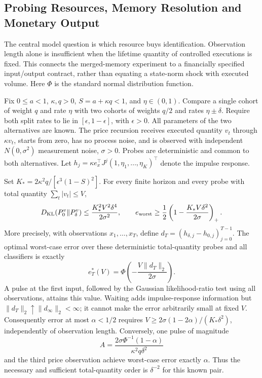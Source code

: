 \subsection{Probing Resources, Memory Resolution and Monetary Output}
\label{sec:resource_frontier}
The central model question is which resource buys identification. Observation length alone is insufficient when the lifetime quantity of controlled executions is fixed. This connects the merged-memory experiment to a financially specified input/output contract, rather than equating a state-norm shock with executed volume. Here $\Phi$ is the standard normal distribution function.

\begin{theorem}
\label{thm:resource_frontier}
Fix $0\le a<1$, $\kappa,q>0$, $S=a+\kappa q<1$, and $\eta\in(0,1)$. Compare a single cohort of weight $q$ and rate $\eta$ with two cohorts of weights $q/2$ and rates $\eta\pm\delta$. Require both split rates to lie in $[\epsilon,1-\epsilon]$, with $\epsilon>0$. All parameters of the two alternatives are known. The price recursion receives executed quantity $v_t$ through $\kappa v_t$, starts from zero, has no process noise, and is observed with independent $N(0,\sigma^2)$ measurement noise, $\sigma>0$. Probes are deterministic and common to both alternatives. Let $h_j=\kappa e_x^\top J^j(1,\eta_1,\ldots,\eta_K)^\top$ denote the impulse response.

Set $K_*=2\kappa^2q/[\epsilon^3(1-S)^2]$. For every finite horizon and every probe with total quantity $\sum_t|v_t|\le V$,
\begin{equation}
D_{\rm KL}(P_0^v\|P_\delta^v)
\le \frac{K_*^2 V^2\delta^4}{2\sigma^2},\qquad
e_{\rm worst}\ge\frac12\left(1-\frac{K_*V\delta^2}{2\sigma}\right)_+.
\label{eq:quantity_information}
\end{equation}
More precisely, with observations $x_1,\ldots,x_T$, define $d_T=(h_{\delta,j}-h_{0,j})_{j=0}^{T-1}$. The optimal worst-case error over these deterministic total-quantity probes and all classifiers is exactly
\begin{equation}
e^*_T(V)=\Phi\!\left(-\frac{V\|d_T\|_2}{2\sigma}\right).
\label{eq:exact_quantity_error}
\end{equation}
A pulse at the first input, followed by the Gaussian likelihood-ratio test using all observations, attains this value. Waiting adds impulse-response information but $\|d_T\|_2\uparrow\|d_\infty\|_2<\infty$; it cannot make the error arbitrarily small at fixed $V$.
Consequently error at most $\alpha<1/2$ requires
$V\ge2\sigma(1-2\alpha)/(K_*\delta^2)$, independently of observation length. Conversely, one pulse of magnitude
\begin{equation}
A=\frac{2\sigma\Phi^{-1}(1-\alpha)}{\kappa^2q\delta^2}
\label{eq:quantity_attainability}
\end{equation}
and the third price observation achieve worst-case error exactly $\alpha$. Thus the necessary and sufficient total-quantity order is $\delta^{-2}$ for this known pair.


\end{theorem}
